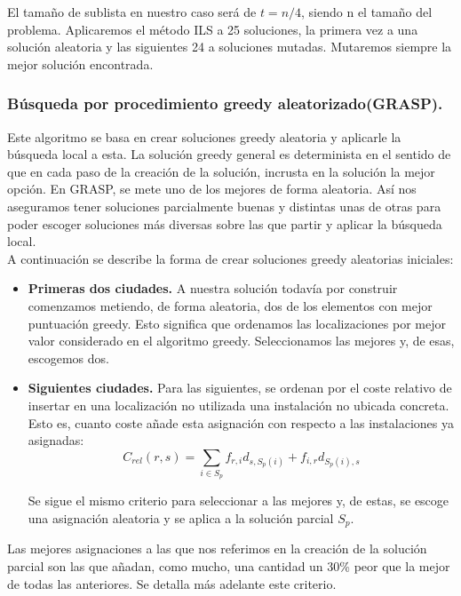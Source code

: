 El tamaño de sublista en nuestro caso será de $t=n/4$, siendo n el tamaño del problema. Aplicaremos el método ILS a 25 soluciones, la primera vez a una solución aleatoria y las siguientes 24 a soluciones mutadas. Mutaremos siempre la mejor solución encontrada.

\subsubsection{Búsqueda por procedimiento greedy aleatorizado(GRASP).}

Este algoritmo se basa en crear soluciones greedy aleatoria y aplicarle la búsqueda local a esta. La solución greedy general es determinista en el sentido de que en cada paso de la creación de la solución, incrusta en la solución la mejor opción. En GRASP, se mete uno de los mejores de forma aleatoria. Así nos aseguramos tener soluciones parcialmente buenas y distintas unas de otras para poder escoger soluciones más diversas sobre las que partir y aplicar la búsqueda local.\\

A continuación se describe la forma de crear soluciones greedy aleatorias iniciales:

\begin{itemize}
	\item \textbf{Primeras dos ciudades.} A nuestra solución todavía por construir comenzamos metiendo, de forma aleatoria, dos de los elementos con mejor puntuación greedy. Esto significa que ordenamos las localizaciones por mejor valor considerado en el algoritmo greedy. Seleccionamos las mejores y, de esas, escogemos dos.
	
	\item \textbf{Siguientes ciudades.} Para las siguientes, se ordenan por el coste relativo de insertar en una localización no utilizada una instalación no ubicada concreta. Esto es, cuanto coste añade esta asignación con respecto a las instalaciones ya asignadas:\\
	
	\[C_{rel}(r,s)=\sum_{i \in S_p}f_{r,i}d_{s,S_p(i)}+f_{i,r}d_{S_p(i),s} \]
	
	Se sigue el mismo criterio para seleccionar a las mejores y, de estas, se escoge una asignación aleatoria y se aplica a la solución parcial $S_p$.
\end{itemize}

Las mejores asignaciones a las que nos referimos en la creación de la solución parcial son las que añadan, como mucho, una cantidad un 30\% peor que la mejor de todas las anteriores. Se detalla más adelante este criterio.



